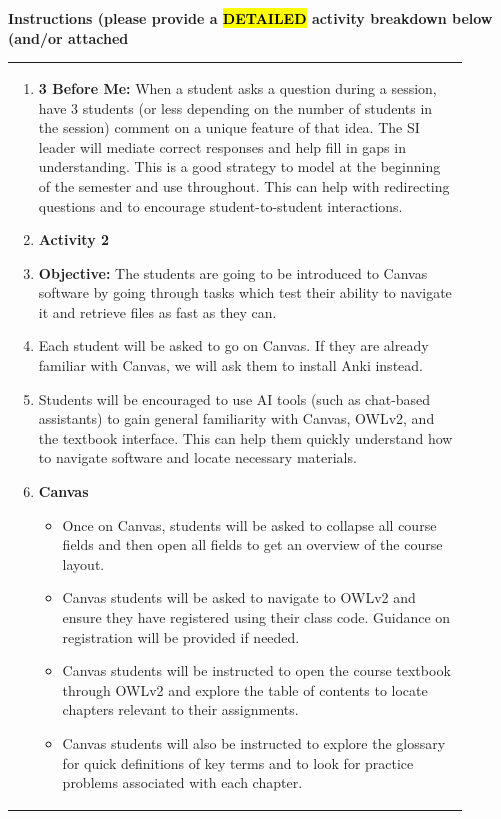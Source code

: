 \documentclass{article}
\begin{document}
\vspace{0.5cm}
\noindent
{\large \textbf{Instructions (please provide a \hl{DETAILED} activity breakdown below (and/or attached}} \\
\newpage
\begin{tabular}{|p{0.9\linewidth}|}
\hline
\begin{enumerate}
    \item \textbf{3 Before Me:} When a student asks a question during a session, have 3 students (or less depending on the number of students in the session) comment on a unique feature of that idea. The SI leader will mediate correct responses and help fill in gaps in understanding. This is a good strategy to model at the beginning of the semester and use throughout. This can help with redirecting questions and to encourage student-to-student interactions.
    \item \textbf{Activity 2}
    \item \textbf{Objective:} The students are going to be introduced to Canvas software by going through tasks which test their ability to navigate it and retrieve files as fast as they can.
    \item Each student will be asked to go on Canvas. If they are already familiar with Canvas, we will ask them to install Anki instead.
    \item Students will be encouraged to use AI tools (such as chat-based assistants) to gain general familiarity with Canvas, OWLv2, and the textbook interface. This can help them quickly understand how to navigate software and locate necessary materials.
    \item \textbf{Canvas}
    \begin{itemize}
        \item Once on Canvas, students will be asked to collapse all course fields and then open all fields to get an overview of the course layout.
        \item Canvas students will be asked to navigate to OWLv2 and ensure they have registered using their class code. Guidance on registration will be provided if needed.
        \item Canvas students will be instructed to open the course textbook through OWLv2 and explore the table of contents to locate chapters relevant to their assignments.
        \item Canvas students will also be instructed to explore the glossary for quick definitions of key terms and to look for practice problems associated with each chapter.

\end{itemize}
\end{enumerate}
\end{tabular}
\end{document}
